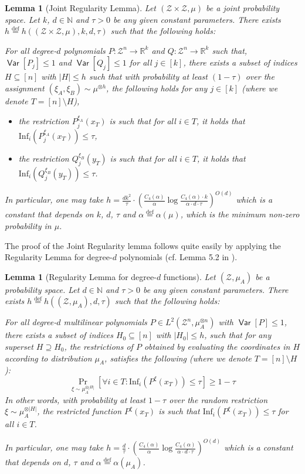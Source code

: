 \documentclass[11pt]{article}
\newcommand{\inparen}[1]{\left ( #1 \right )}
\newcommand{\insquare}[1]{\left [ #1 \right ]}
\newcommand{\defeq}{\stackrel{\mathrm{def}}{=}}
\DeclareMathOperator*{\Var}{\mathsf{Var}}
\newcommand{\bbN}{{\mathbb N}}
\newcommand{\bbR}{{\mathbb R}}
\newcommand{\calZ}{\mathcal{Z}}
\newcommand{\Inf}{\mathrm{Inf}}
\newtheorem{lem}[theorem]{Lemma}
\begin{document}
\begin{lem}[Joint Regularity Lemma]\label{lem:joint_regularity}
	Let $(\calZ \times \calZ, \mu)$ be a joint probability space. Let $k$, $d \in \bbN$ and $\tau > 0$ be any given constant parameters. There exists $h \defeq h((\calZ \times \calZ, \mu), k, d, \tau)$ such that the following holds:
	
	For all degree-$d$ polynomials $P : \calZ^n \to \bbR^k$ and $Q : \calZ^n \to \bbR^k$ such that, $\Var[P_{j}] \le 1$ and $\Var[Q_{j}] \le 1$ for all $j \in [k]$, there exists a subset of indices $H \subseteq [n]$ with $|H| \le h$ such that with probability at least $(1-\tau)$ over the assignment $(\xi_A, \xi_B) \sim \mu^{\otimes h}$, the following holds for any $j \in [k]$ (where we denote $T = [n] \setminus H$),
	\begin{itemize}
		\item the restriction $P_{j}^{\xi_A}(x_T)$ is such that for all $i \in T$, it holds that $\Inf_i(P_{j}^{\xi_A}(x_T)) \le \tau$,
		\item the restriction $Q_{j}^{\xi_B}(y_T)$ is such that for all $i \in T$, it holds that $\Inf_i(Q_{j}^{\xi_B}(y_T)) \le \tau$.
	\end{itemize}
	\noindent In particular, one may take $h = \frac{dk^2}{\tau} \cdot \inparen{\frac{C_4(\alpha)}{\alpha} \log \frac{C_4(\alpha) \cdot k}{\alpha \cdot d \cdot \tau}}^{O(d)}$ which is a constant that depends on $k$, $d$, $\tau$ and $\alpha \defeq \alpha(\mu)$, which is the minimum non-zero probability in $\mu$.
\end{lem}

The proof of the Joint Regularity lemma follows quite easily by applying the Regularity Lemma for degree-$d$ polynomials (cf. Lemma 5.2 in \cite{GKS_NIS_decidable}).

\begin{lem}[Regularity Lemma for degree-$d$ functions]\label{lem:single_reg_lem}
	Let $(\calZ, \mu_A)$ be a probability space. Let $d \in \bbN$ and $\tau > 0$ be any given constant parameters. There exists $h \defeq h((\calZ, \mu_A), d, \tau)$ such that the following holds:
	
	For all degree-$d$ multilinear polynomials $P \in L^2(\calZ^n, \mu_{A}^{\otimes n})$ with $\Var[P] \le 1$, there exists a subset of indices $H_0 \subseteq [n]$ with $|H_0| \le h$, such that for any superset $H \supseteq H_0$, the restrictions of $P$ obtained by evaluating the coordinates in $H$ according to distribution $\mu_A$, satisfies the following (where we denote $T = [n] \setminus H$):
	$$\Pr\limits_{\xi \sim \mu_A^{\otimes |H|}} \insquare{\forall i \in T : \Inf_i(P^{\xi}(x_T)) \le \tau} \ge 1-\tau$$
	In other words, with probability at least $1-\tau$ over the random restriction $\xi \sim \mu_{A}^{\otimes |H|}$, the restricted function $P^{\xi}(x_T)$ is such that $\Inf_i(P^{\xi}(x_T)) \le \tau$ for all $i \in T$.
	
	\noindent In particular, one may take $h = \frac{d}{\tau} \cdot \inparen{\frac{C_4(\alpha)}{\alpha} \log \frac{C_4(\alpha)}{\alpha \cdot d \cdot \tau}}^{O(d)}$ which is a constant that depends on $d$, $\tau$ and $\alpha \defeq \alpha(\mu_A)$.
\end{lem}
\end{document}
